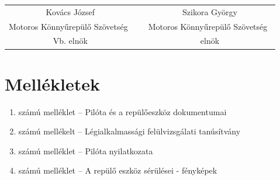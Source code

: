 \documentclass[a4paper,10pt]{article}
\newcommand{\mksz}{Motoros Könnyűrepülő Szövetség\ }
\begin{document}
\begin{tabular*}{16cm}{ccc}
 Kovács József&\hspace{3cm} &Szikora György\\
 \mksz&\hspace{3cm} &\mksz\\
 Vb. elnök&\hspace{3cm} &elnök\\
\end{tabular*}

\pagebreak
\section{Mellékletek}
\begin{enumerate}
 \item számú melléklet -- Pilóta és a repülőeszköz dokumentumai
 \item számú mellékelt -- Légialkalmassági felülvizsgálati tanúsítvány
 \item számú melléklet -- Pilóta nyilatkozata
 \item számú melléklet -- A repülő eszköz sérülései - fényképek
\end{enumerate}

\pagebreak







\pagebreak
\end{document}
